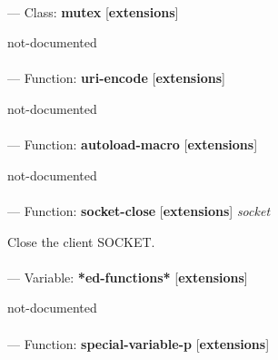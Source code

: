 \paragraph{}
\label{EXTENSIONS:MUTEX}
--- Class: \textbf{mutex} [\textbf{extensions}] \textit{}

\begin{adjustwidth}{5em}{5em}
not-documented
\end{adjustwidth}

\paragraph{}
\label{EXTENSIONS:URI-ENCODE}
--- Function: \textbf{uri-encode} [\textbf{extensions}] \textit{}

\begin{adjustwidth}{5em}{5em}
not-documented
\end{adjustwidth}

\paragraph{}
\label{EXTENSIONS:AUTOLOAD-MACRO}
--- Function: \textbf{autoload-macro} [\textbf{extensions}] \textit{}

\begin{adjustwidth}{5em}{5em}
not-documented
\end{adjustwidth}

\paragraph{}
\label{EXTENSIONS:SOCKET-CLOSE}
--- Function: \textbf{socket-close} [\textbf{extensions}] \textit{socket}

\begin{adjustwidth}{5em}{5em}
Close the client SOCKET.
\end{adjustwidth}

\paragraph{}
\label{EXTENSIONS:*ED-FUNCTIONS*}
--- Variable: \textbf{*ed-functions*} [\textbf{extensions}] \textit{}

\begin{adjustwidth}{5em}{5em}
not-documented
\end{adjustwidth}

\paragraph{}
\label{EXTENSIONS:SPECIAL-VARIABLE-P}
--- Function: \textbf{special-variable-p} [\textbf{extensions}] \textit{}

